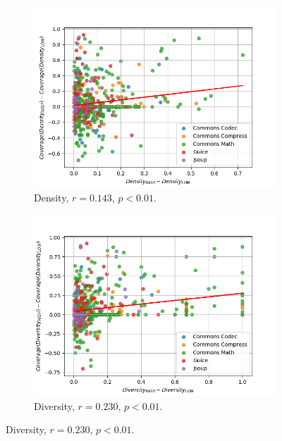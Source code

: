 \documentclass[twoside,a4paper,11pt]{memoir}
\begin{document}
\begin{figure}
    \centering
    \begin{subfigure}[b]{0.49\linewidth}
        \centering
        \includegraphics[width=\linewidth]{figures/delta_coverage_density}
        \caption{Density, $r=0.143$, $p<0.01$.}
        \label{fig:delta_coverage_density}
    \end{subfigure}
    \hfill
    \begin{subfigure}[b]{0.49\linewidth}
        \centering
        \includegraphics[width=\linewidth]{figures/delta_coverage_diversity}
        \caption{Diversity, $r=0.230$, $p < 0.01$.}
        \label{fig:delta_coverage_diversity}
    \end{subfigure}

\end{figure}
\end{document}

